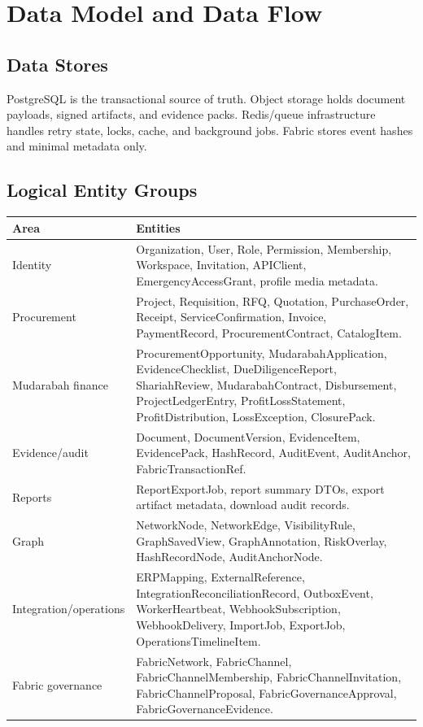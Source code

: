\documentclass[11pt,a4paper]{article}
\begin{document}
\section{Data Model and Data Flow}
\subsection{Data Stores}
PostgreSQL is the transactional source of truth. Object storage holds document payloads, signed artifacts, and evidence packs. Redis/queue infrastructure handles retry state, locks, cache, and background jobs. Fabric stores event hashes and minimal metadata only.

\subsection{Logical Entity Groups}
\begin{longtable}{L{36mm}L{98mm}}
\toprule
\textbf{Area} & \textbf{Entities} \\
\midrule
Identity & Organization, User, Role, Permission, Membership, Workspace, Invitation, APIClient, EmergencyAccessGrant, profile media metadata. \\
Procurement & Project, Requisition, RFQ, Quotation, PurchaseOrder, Receipt, ServiceConfirmation, Invoice, PaymentRecord, ProcurementContract, CatalogItem. \\
Mudarabah finance & ProcurementOpportunity, MudarabahApplication, EvidenceChecklist, DueDiligenceReport, ShariahReview, MudarabahContract, Disbursement, ProjectLedgerEntry, ProfitLossStatement, ProfitDistribution, LossException, ClosurePack. \\
Evidence/audit & Document, DocumentVersion, EvidenceItem, EvidencePack, HashRecord, AuditEvent, AuditAnchor, FabricTransactionRef. \\
Reports & ReportExportJob, report summary DTOs, export artifact metadata, download audit records. \\
Graph & NetworkNode, NetworkEdge, VisibilityRule, GraphSavedView, GraphAnnotation, RiskOverlay, HashRecordNode, AuditAnchorNode. \\
Integration/operations & ERPMapping, ExternalReference, IntegrationReconciliationRecord, OutboxEvent, WorkerHeartbeat, WebhookSubscription, WebhookDelivery, ImportJob, ExportJob, OperationsTimelineItem. \\
Fabric governance & FabricNetwork, FabricChannel, FabricChannelMembership, FabricChannelInvitation, FabricChannelProposal, FabricGovernanceApproval, FabricGovernanceEvidence. \\
\bottomrule
\end{longtable}
\end{document}
